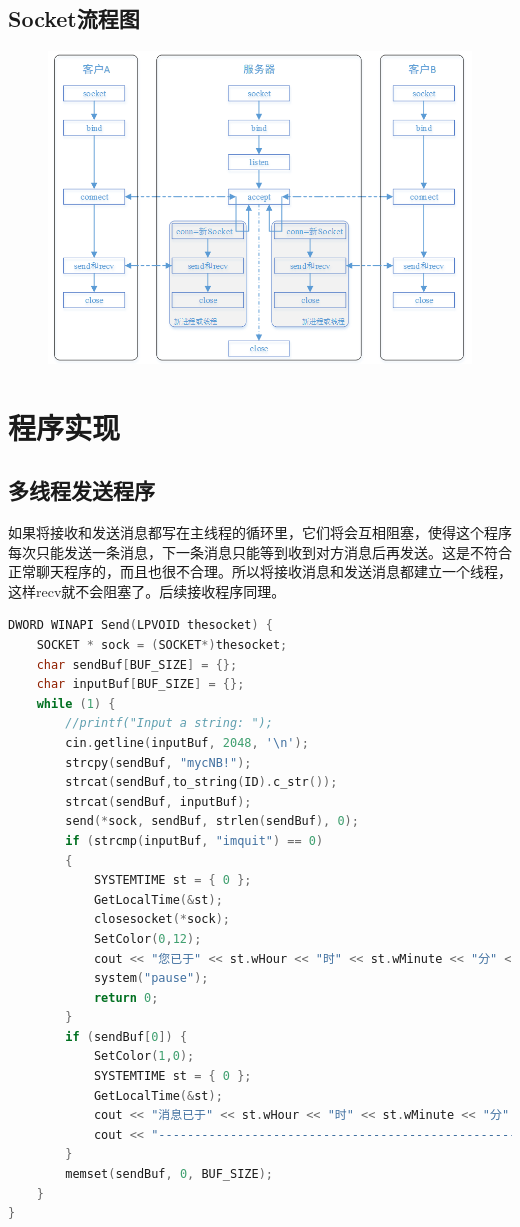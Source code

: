 \documentclass[UTF8,a4paper,10pt]{ctexart}
\begin{document}
\subsection{Socket流程图}
\begin{figure}[H]
    \centering
    \includegraphics[scale=0.8]{1.png}
    \label{fig:1}
\end{figure}
\section{程序实现}
\subsection{多线程发送程序}
如果将接收和发送消息都写在主线程的循环里，它们将会互相阻塞，使得这个程序每次只能发送一条消息，下一条消息只能等到收到对方消息后再发送。这是不符合正常聊天程序的，而且也很不合理。所以将接收消息和发送消息都建立一个线程，这样recv就不会阻塞了。后续接收程序同理。
\begin{lstlisting}[frame=trbl,language={C++}]
DWORD WINAPI Send(LPVOID thesocket) {
    SOCKET * sock = (SOCKET*)thesocket;
    char sendBuf[BUF_SIZE] = {};
    char inputBuf[BUF_SIZE] = {};
    while (1) {
        //printf("Input a string: ");
        cin.getline(inputBuf, 2048, '\n');
        strcpy(sendBuf, "mycNB!");
        strcat(sendBuf,to_string(ID).c_str());
        strcat(sendBuf, inputBuf);
        send(*sock, sendBuf, strlen(sendBuf), 0);
        if (strcmp(inputBuf, "imquit") == 0)
        {
            SYSTEMTIME st = { 0 };
            GetLocalTime(&st);
            closesocket(*sock);
            SetColor(0,12);
            cout << "您已于" << st.wHour << "时" << st.wMinute << "分" << st.wSecond << "秒选择结束聊天了！再见哟！（//▽//）" << endl;
            system("pause");
            return 0;
        }
        if (sendBuf[0]) {
            SetColor(1,0);
            SYSTEMTIME st = { 0 };
            GetLocalTime(&st);
            cout << "消息已于" << st.wHour << "时" << st.wMinute << "分" << st.wSecond << "秒成功发送\n" ;
            cout << "-------------------------------------------------------------" << endl;
        }
        memset(sendBuf, 0, BUF_SIZE);
    }
}
\end{lstlisting}
\end{document}
